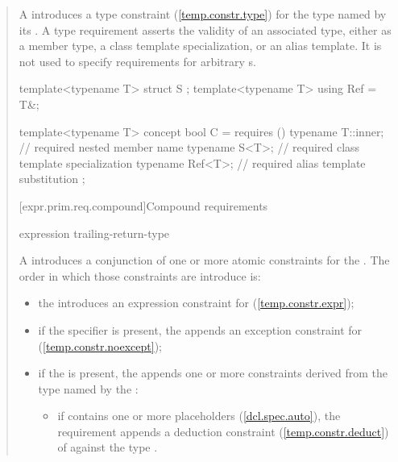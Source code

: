 \begin{quote}
\pnum
A  introduces a type 
constraint (\ref{temp.constr.type}) for the type named by its
.
%
\enternote
A type requirement asserts the validity of an associated
type, either as a member type, a class template specialization,
or an alias template. It is not used to specify requirements for
arbitrary s.
\exitnote
%
\enterexample
\begin{codeblock}
template<typename T> struct S { };
template<typename T> using Ref = T&;

template<typename T> concept bool C =
  requires () {
    typename T::inner; // required nested member name
    typename S<T>;     // required class template specialization
    typename Ref<T>;   // required alias template substitution
  };
\end{codeblock}
\exitexample


[expr.prim.req.compound]{Compound requirements}
      
\begin{bnf}
\br
  \terminal{\{} expression \terminal{\}} \opt 
    trailing-return-type\opt~\terminal{;}
\end{bnf}

\pnum
A  introduces 
a conjunction of one or more atomic constraints for the
 . The order in which
those constraints are introduce is:
%
\begin{itemize}
\item the  introduces an expression 
constraint for  (\ref{temp.constr.expr});

\item if the  specifier is present, the 
 appends an exception constraint for 
 (\ref{temp.constr.noexcept});

\item if the  is present, the
 appends one or more constraints derived 
from the type  named by the :

\begin{itemize}
\item if  contains one or more placeholders (\ref{dcl.spec.auto}), 
the requirement appends a deduction constraint (\ref{temp.constr.deduct}) 
of  against the type .


\end{itemize}
\end{itemize}
\end{quote}
